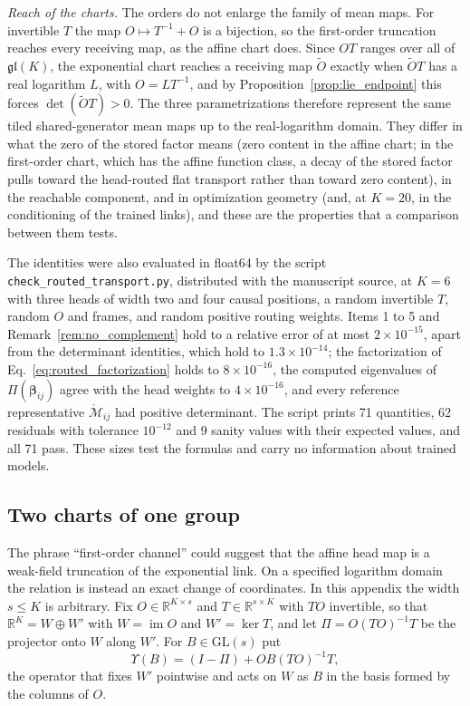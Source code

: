 \documentclass[twoside,11pt]{article}
\begin{document}
\emph{Reach of the charts.} The orders do not enlarge the family of mean maps. For invertible $T$ the map $O\mapsto T^{-1}+O$ is a bijection, so the first-order truncation reaches every receiving map, as the affine chart does. Since $OT$ ranges over all of $\mathfrak{gl}(K)$, the exponential chart reaches a receiving map $\widetilde O$ exactly when $\widetilde OT$ has a real logarithm $L$, with $O=LT^{-1}$, and by Proposition~\ref{prop:lie_endpoint} this forces $\det(\widetilde OT)>0$. The three parametrizations therefore represent the same tiled shared-generator mean maps up to the real-logarithm domain. They differ in what the zero of the stored factor means (zero content in the affine chart; in the first-order chart, which has the affine function class, a decay of the stored factor pulls toward the head-routed flat transport rather than toward zero content), in the reachable component, and in optimization geometry (and, at $K=20$, in the conditioning of the trained links), and these are the properties that a comparison between them tests.

The identities were also evaluated in float64 by the script \texttt{check\_\allowbreak routed\_\allowbreak transport.py}, distributed with the manuscript source, at $K=6$ with three heads of width two and four causal positions, a random invertible $T$, random $O$ and frames, and random positive routing weights. Items 1 to 5 and Remark~\ref{rem:no_complement} hold to a relative error of at most $2\times10^{-15}$, apart from the determinant identities, which hold to $1.3\times10^{-14}$; the factorization of Eq.~\eqref{eq:routed_factorization} holds to $8\times10^{-16}$, the computed eigenvalues of $\Pi(\boldsymbol\beta_{ij})$ agree with the head weights to $4\times10^{-16}$, and every reference representative $\mathring{\mathcal M}_{ij}$ had positive determinant. The script prints 71 quantities, 62 residuals with tolerance $10^{-12}$ and 9 sanity values with their expected values, and all 71 pass. These sizes test the formulas and carry no information about trained models.

\subsection{Two charts of one group}
\label{app:proof_lie_charts}

The phrase ``first-order channel'' could suggest that the affine head map is a weak-field truncation of the exponential link. On a specified logarithm domain the relation is instead an exact change of coordinates. In this appendix the width $s\le K$ is arbitrary. Fix $O\in\mathbb R^{K\times s}$ and $T\in\mathbb R^{s\times K}$ with $TO$ invertible, so that $\mathbb R^K=W\oplus W'$ with $W=\operatorname{im}O$ and $W'=\ker T$, and let $\Pi=O(TO)^{-1}T$ be the projector onto $W$ along $W'$. For $B\in\mathrm{GL}(s)$ put
\begin{equation}
\Upsilon(B)=(I-\Pi)+OB(TO)^{-1}T,
\label{eq:lie_embed}
\end{equation}
the operator that fixes $W'$ pointwise and acts on $W$ as $B$ in the basis formed by the columns of $O$.
\end{document}
